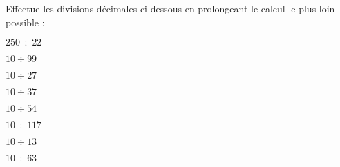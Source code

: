 Effectue les divisions décimales ci-dessous en prolongeant le calcul
le plus loin possible :
\begin{multicols}{4}
  \begin{myenumerate}
    \item $250\div22$
    \item $10\div99$
    \item $10\div27$
    \item $10\div37$
    \item $10\div54$
    \item $10\div117$
    \item $10\div13$
    \item $10\div63$
  \end{myenumerate}
\end{multicols}
